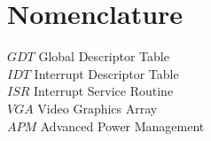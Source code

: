 \section*{\centering Nomenclature}
\vspace{1.5 cm}

\begin{flushleft}
	

$GDT$   \hspace{1.0 cm} Global Descriptor Table\\
$IDT$   \hspace{1.0 cm} Interrupt Descriptor Table\\
$ISR$   \hspace{1.0 cm} Interrupt Service Routine\\
$VGA$   \hspace{1.0 cm} Video Graphics Array\\
$APM$   \hspace{1.0 cm} Advanced Power Management\\



\end{flushleft}